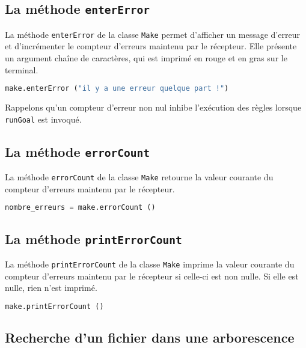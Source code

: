 \documentclass[a4paper,12pt,obeyspaces,openany]{extarticle}
\begin{document}
\subsection{La méthode \texttt{enterError}}

La méthode \texttt{enterError} de la classe \texttt{Make} permet d'afficher un message d'erreur et d'incrémenter le compteur d'erreurs maintenu par le récepteur. Elle présente un argument chaîne de caractères, qui est imprimé en rouge et en gras sur le terminal.
\begin{lstlisting}[language=py]
make.enterError ("il y a une erreur quelque part !")
\end{lstlisting}
Rappelons qu'un compteur d'erreur non nul inhibe l'exécution des règles lorsque \texttt{runGoal} est invoqué.


\subsection{La méthode \texttt{errorCount}}

La méthode \texttt{errorCount} de la classe \texttt{Make} retourne la valeur courante du compteur d'erreurs maintenu par le récepteur.
\begin{lstlisting}[language=py]
nombre_erreurs = make.errorCount ()
\end{lstlisting}


\subsection{La méthode \texttt{printErrorCount}}

La méthode \texttt{printErrorCount} de la classe \texttt{Make} imprime la valeur courante du compteur d'erreurs maintenu par le récepteur si celle-ci est non nulle. Si elle est nulle, rien n'est imprimé.
\begin{lstlisting}[language=py]
make.printErrorCount ()
\end{lstlisting}


\subsection{Recherche d'un fichier dans une arborescence}
\end{document}
